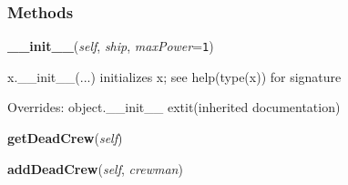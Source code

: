 
  \subsubsection{Methods}

    \vspace{0.5ex}

\hspace{.8\funcindent}\begin{boxedminipage}{\funcwidth}

    \raggedright \textbf{\_\_init\_\_}(\textit{self}, \textit{ship}, \textit{maxPower}={\tt 1})

\setlength{\parskip}{2ex}
    x.\_\_init\_\_(...) initializes x; see help(type(x)) for signature

\setlength{\parskip}{1ex}
      Overrides: object.\_\_init\_\_ 	extit{(inherited documentation)}

    \end{boxedminipage}

    \label{systems:CloneBay:getDeadCrew}

    \vspace{0.5ex}

\hspace{.8\funcindent}\begin{boxedminipage}{\funcwidth}

    \raggedright \textbf{getDeadCrew}(\textit{self})

\setlength{\parskip}{2ex}
\setlength{\parskip}{1ex}
    \end{boxedminipage}

    \label{systems:CloneBay:addDeadCrew}

    \vspace{0.5ex}

\hspace{.8\funcindent}\begin{boxedminipage}{\funcwidth}

    \raggedright \textbf{addDeadCrew}(\textit{self}, \textit{crewman})

\setlength{\parskip}{2ex}
\setlength{\parskip}{1ex}
    \end{boxedminipage}

